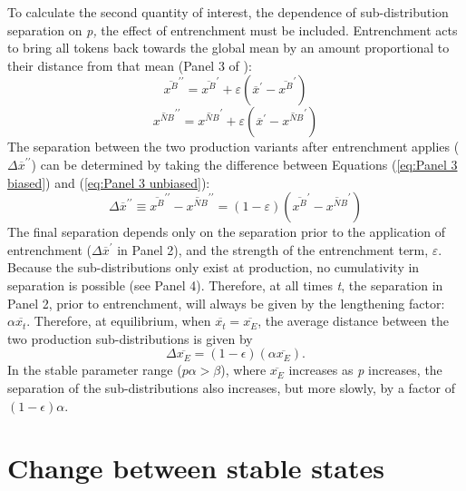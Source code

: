 To calculate the second quantity of interest, the dependence of sub-distribution
separation on \emph{p,} the effect of entrenchment must be included.
Entrenchment acts to bring all tokens back towards the global mean
by an amount proportional to their distance from that mean (Panel
3 of ): 
\begin{equation}
\overline{x^{B}}^{\prime\prime}=\overline{x^{B}}^{\prime}+\varepsilon\left(\overline{x}^{\prime}-\overline{x^{B}}^{\prime}\right)\label{eq:Panel 3 biased}
\end{equation}
\begin{equation}
\overline{x^{NB}}^{\prime\prime}=\overline{x^{NB}}^{\prime}+\varepsilon\left(\overline{x}^{\prime}-\overline{x^{NB}}^{\prime}\right)\label{eq:Panel 3 unbiased}
\end{equation}
The separation between the two production variants after entrenchment
applies ($\Delta\overline{x}^{\prime\prime}$) can be determined
by taking the difference between Equations (\ref{eq:Panel 3 biased})
and (\ref{eq:Panel 3 unbiased}): 
\begin{equation}
\Delta\overline{x}^{\prime\prime}\equiv\overline{x^{B}}^{\prime\prime}-\overline{x^{NB}}^{\prime\prime}=\left(1-\varepsilon\right)\left(\overline{x^{B}}^{\prime}-\overline{x^{NB}}^{\prime}\right)
\end{equation}
The final separation depends only on the separation prior to the application
of entrenchment ($\Delta\overline{x}^{\prime}$ in Panel 2), and
the strength of the entrenchment term, $\varepsilon$. Because the
sub-distributions only exist at production, no cumulativity in separation
is possible (see Panel 4). Therefore, at all times \emph{t}, the separation
in Panel 2, prior to entrenchment, will always be given by the lengthening
factor: $\alpha\overline{x_{t}}$. Therefore, at equilibrium, when
$\overline{x_{t}}=\overline{x_{E}}$, the average distance between
the two production sub-distributions is given by
\begin{equation}
\Delta\overline{x_{E}}=(1-\epsilon)(\alpha\overline{x_{E}}).\label{eq:Cat Sep}
\end{equation}
In the stable parameter range ($p\alpha>\beta$), where $\overline{x_{E}}$
increases as \emph{p} increases, the separation of the sub-distributions
also increases, but more slowly, by a factor of $(1-\epsilon)\alpha$.

\section{\label{sec:Actuation}Change between stable states}

